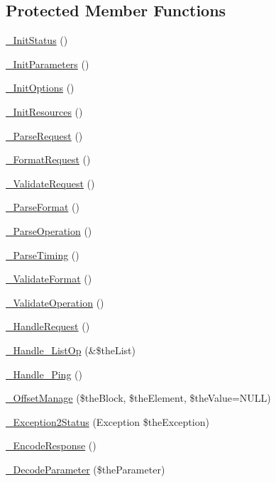 \subsection*{Protected Member Functions}
\begin{DoxyCompactItemize}
\item 
\hyperlink{class_c_wrapper_a8369eec2e53b3f6394a35bcd919d8779}{\-\_\-\-Init\-Status} ()
\item 
\hyperlink{class_c_wrapper_a2ce212bc7543b4ed07dbc93282d298f6}{\-\_\-\-Init\-Parameters} ()
\item 
\hyperlink{class_c_wrapper_aec2fa3594e36a380d66743b47c24490c}{\-\_\-\-Init\-Options} ()
\item 
\hyperlink{class_c_wrapper_a0e5c5488fce4b388e43dcf6810874d74}{\-\_\-\-Init\-Resources} ()
\item 
\hyperlink{class_c_wrapper_a6675c744053f1b05547ad28fc50a79e6}{\-\_\-\-Parse\-Request} ()
\item 
\hyperlink{class_c_wrapper_a2a3d95961650654468789883ab1607e5}{\-\_\-\-Format\-Request} ()
\item 
\hyperlink{class_c_wrapper_a24b22cfd0022c1cba1741fb294fba5ba}{\-\_\-\-Validate\-Request} ()
\item 
\hyperlink{class_c_wrapper_a53d59f3a61137b8d6f5707d794e2961a}{\-\_\-\-Parse\-Format} ()
\item 
\hyperlink{class_c_wrapper_aa090c135ca1085f46d8cddd393131ea6}{\-\_\-\-Parse\-Operation} ()
\item 
\hyperlink{class_c_wrapper_a13421345af75888b1fa8bcd3381b52a5}{\-\_\-\-Parse\-Timing} ()
\item 
\hyperlink{class_c_wrapper_a8994ff7a5f94438da1c5e3505b145dbd}{\-\_\-\-Validate\-Format} ()
\item 
\hyperlink{class_c_wrapper_aab3f7b2ca4cd9e692c35510d753918a4}{\-\_\-\-Validate\-Operation} ()
\item 
\hyperlink{class_c_wrapper_a12c1dd1f1d1cf0ae889cc19ff17ced0e}{\-\_\-\-Handle\-Request} ()
\item 
\hyperlink{class_c_wrapper_aeff4d2ab12617c1dda2bed705a6969bb}{\-\_\-\-Handle\-\_\-\-List\-Op} (\&\$the\-List)
\item 
\hyperlink{class_c_wrapper_ab58ee7076059e0f992c2a642043b764f}{\-\_\-\-Handle\-\_\-\-Ping} ()
\item 
\hyperlink{class_c_wrapper_aff9eb1799c8f30cb33967c7a50ce6395}{\-\_\-\-Offset\-Manage} (\$the\-Block, \$the\-Element, \$the\-Value=N\-U\-L\-L)
\item 
\hyperlink{class_c_wrapper_ad8dd05c155df0d8fe19be35d4bb67b56}{\-\_\-\-Exception2\-Status} (Exception \$the\-Exception)
\item 
\hyperlink{class_c_wrapper_a60583bacf329d484d01df9851602759f}{\-\_\-\-Encode\-Response} ()
\item 
\hyperlink{class_c_wrapper_a9b96298777cc3aa5817a2039fc8f29bc}{\-\_\-\-Decode\-Parameter} (\$the\-Parameter)
\end{DoxyCompactItemize}
